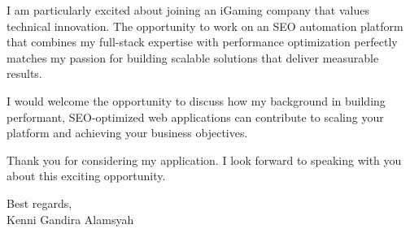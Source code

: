 \documentclass[12pt]{article}
\begin{document}
\begin{flushleft}
I am particularly excited about joining an iGaming company that values technical innovation. The opportunity to work on an SEO automation platform that combines my full-stack expertise with performance optimization perfectly matches my passion for building scalable solutions that deliver measurable results.

I would welcome the opportunity to discuss how my background in building performant, SEO-optimized web applications can contribute to scaling your platform and achieving your business objectives.

Thank you for considering my application. I look forward to speaking with you about this exciting opportunity.

\vspace{0.5cm}

Best regards, \\
Kenni Gandira Alamsyah

\end{flushleft}
\end{document}
